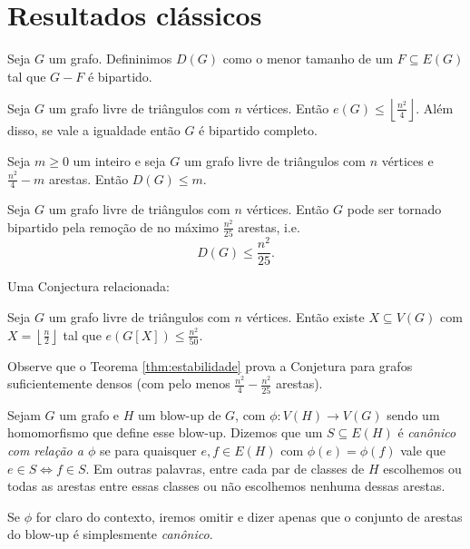 \chapter{Resultados clássicos}
\label{cap:classicos}


Seja $G$ um grafo. Defininimos $D(G)$ como o menor tamanho de um $F \subseteq E(G)$ tal que $G-F$ é bipartido.

\begin{theorem}[Mantel]
  Seja $G$ um grafo livre de triângulos com $n$ vértices.
  Então $e(G) \leq \left\lfloor\frac{n^2}{4}\right\rfloor$.
  Além disso, se vale a igualdade então $G$ é bipartido completo.
\end{theorem}

\begin{theorem}[Estabilidade] \label{thm:estabilidade}
  Seja $m \geq 0$ um inteiro e seja $G$ um grafo livre de triângulos com $n$ vértices e $\frac{n^2}{4}-m$ arestas.
  Então $D(G) \leq m$.
\end{theorem}

\begin{conjecture}[Erd\H os] \label{conj:make-bipartite}
  Seja $G$ um grafo livre de triângulos com $n$ vértices.
  Então $G$ pode ser tornado bipartido pela remoção de no máximo $\frac{n^2}{25}$ arestas,
  i.e. \[D(G) \leq \frac{n^2}{25}.\]
\end{conjecture}

Uma Conjectura relacionada:

\begin{conjecture} \label{conj:metadinha}
  Seja $G$ um grafo livre de triângulos com $n$ vértices.
  Então existe $X \subseteq V(G)$ com $X = \left\lfloor \frac{n}{2} \right\rfloor$ tal que $e(G[X]) \leq \frac{n^2}{50}$.
\end{conjecture}

Observe que o Teorema \ref{thm:estabilidade} prova a Conjetura para grafos suficientemente densos (com pelo menos $\frac{n^2}{4} - \frac{n^2}{25}$ arestas).

\begin{definition}
  Sejam $G$ um grafo e $H$ um blow-up de $G$, com $\phi \colon V(H) \to V(G)$ sendo um homomorfismo que define esse blow-up.
  Dizemos que um $S \subseteq E(H)$ é \emph{canônico com relação a $\phi$} se para quaisquer $e,f \in E(H)$ com
  $\phi(e)=\phi(f)$ vale que $e \in S \iff f \in S$.
  Em outras palavras, entre cada par de classes de $H$ escolhemos ou todas as arestas entre essas classes ou não escolhemos nenhuma dessas arestas.
  
  Se $\phi$ for claro do contexto, iremos omitir e dizer apenas que o conjunto de arestas do blow-up é simplesmente \emph{canônico}.
\end{definition}


